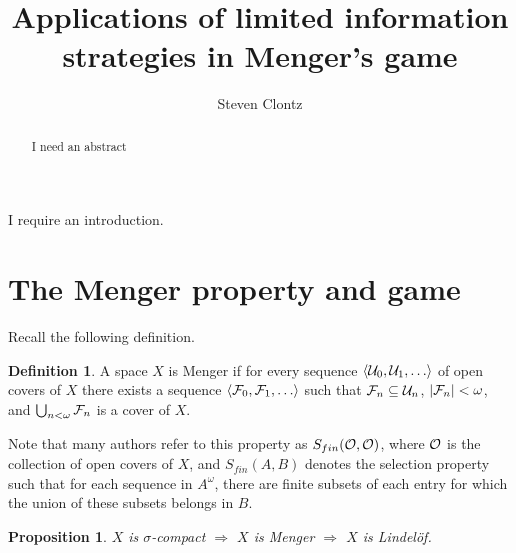 \documentclass{amsart}
\newtheorem{proposition}[theorem]{Proposition}
\theoremstyle{definition}
\newtheorem{definition}[theorem]{Definition}
\begin{document}
\title{Applications of limited information strategies in Menger's game}




\author{Steven Clontz}
\address{Department of Mathematics and Statistics, UNC Charlotte,
Charlotte, NC 28262}




\begin{abstract}
  I need an abstract
\end{abstract}


\maketitle

I require an introduction.

\section{The Menger property and game}

Recall the following definition.

\begin{definition}
  A space \(X\) is Menger if for every sequence \(\<\mc U_0,\mc U_1,\dots\>\)
  of open covers of \(X\) there exists a sequence
  \(\<\mc F_0,\mc F_1,\dots\>\) such that \(\mathcal{F}_n\subseteq \mathcal{U}_n\),
  \(|\mathcal{F}_n|<\omega\), and \(\bigcup_{n<\omega}\mathcal{F}_n\) is a cover of \(X\).
\end{definition}

Note that many authors refer to this property as \(S_{fin}(\mathcal{O},\mathcal{O})\),
where \(\mathcal{O}\) is the collection of open covers of \(X\), and
\(S_{fin}(A,B)\) denotes the selection property such that for each
sequence in \(A^\omega\), there are finite subsets of each entry for which
the union of these subsets belongs in \(B\).

\begin{proposition}
  \(X\) is \(\sigma\)-compact
    \(\Rightarrow\)
  \(X\) is Menger
    \(\Rightarrow\)
  \(X\) is Lindel\"of.
\end{proposition}
\end{document}
